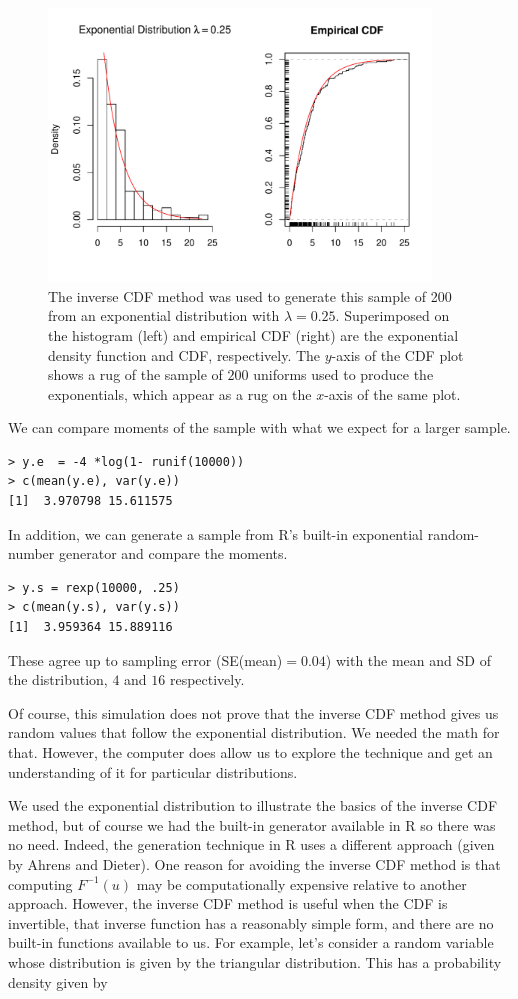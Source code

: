\begin{figure}[htbp]
  \begin{center}
    \leavevmode
     \includegraphics[width=4in]{RNG/images/expInvCDF.pdf}    
    \caption{The inverse CDF method was used to generate this sample of 200 from an exponential distribution with $\lambda = 0.25$.  Superimposed on the histogram (left) and empirical CDF (right) are the exponential density function and CDF, respectively.  The $y$-axis of the CDF plot shows a rug of the sample of  $200$ uniforms used to produce the exponentials, which appear as a rug on the $x$-axis of the same plot.}
    \label{fig:expInv}
  \end{center}
\end{figure}


We can compare moments of the sample with what we expect for a larger sample.
\begin{verbatim}
> y.e  = -4 *log(1- runif(10000))
> c(mean(y.e), var(y.e))
[1]  3.970798 15.611575
\end{verbatim}
In addition, we can generate a sample from R's built-in exponential
random-number generator and compare the moments.
\begin{verbatim}
> y.s = rexp(10000, .25)
> c(mean(y.s), var(y.s))
[1]  3.959364 15.889116
\end{verbatim}
These agree up to sampling error  (SE(mean)$ = 0.04$)
with the mean and SD of the distribution, $4$ and $16$ respectively.

Of course, this simulation does not prove that the inverse CDF method
gives us random values that follow the exponential distribution.  
We needed the math for that. 
However, the computer does allow us to explore the technique and
get an understanding of it for particular distributions.

We used the exponential distribution to illustrate the basics of the
inverse CDF method, but of course we had the built-in generator
available in R so there was no need.  Indeed, the generation
technique in R uses a different approach (given by Ahrens and Dieter).
One reason for avoiding the inverse CDF method is that computing
$F^{-1}(u)$ may be computationally expensive relative to another
approach.  However, the inverse CDF method is useful when the CDF is
invertible, that inverse function has a reasonably simple form, and
there are no built-in functions available to us.  For example, let's
consider a random variable whose distribution is given by the
triangular distribution.  This has a probability density given by

